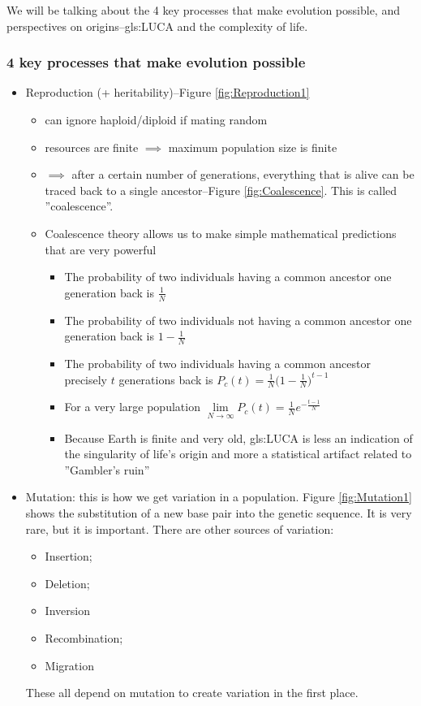\documentclass[]{article}
\begin{document}
We will be talking about the 4 key processes that make evolution possible, and perspectives on origins--\gls{gls:LUCA} and the complexity of life.

\subsubsection{4 key processes that make evolution possible}

\begin{itemize}
	\item Reproduction (+ heritability)--Figure \ref{fig:Reproduction1}
	\begin{itemize}
		\item can ignore haploid/diploid if mating random
		\item resources are finite $\implies$ maximum population size is finite
		\item $\implies$ after a certain number of generations, everything that is alive can be traced back to a single ancestor--Figure \ref{fig:Coalescence}. This is called ''coalescence''.
		\item Coalescence theory allows us to make simple mathematical predictions that are very powerful
		\begin{itemize}
			\item The probability of two individuals having a common ancestor one generation back is $\frac{1}{N}$
			\item The probability of two individuals not having a common ancestor one generation back is $1-\frac{1}{N}$
			\item The probability of two individuals having a common ancestor precisely $t$ generations back is $P_c(t)=\frac{1}{N}\big(1-\frac{1}{N}\big)^{t-1}$
			\item For a very large population $\lim\limits_{N\rightarrow \infty} P_c(t)=\frac{1}{N}e^{-\frac{t-1}{N}}$
			\item Because Earth is finite and very old, \gls{gls:LUCA} is less an
			indication of the singularity of life’s origin and more a
			statistical artifact related to ''Gambler’s ruin''
		\end{itemize}
	
	\end{itemize}
	\item Mutation: this is how we get variation in a population. Figure \ref{fig:Mutation1} shows the substitution of a new base pair into the genetic sequence. It is very rare, but it is important. There are other sources of variation:
	\begin{itemize}
		\item  Insertion;
		\item Deletion;
		\item Inversion
		\item Recombination;
		\item Migration
	\end{itemize}
	These all depend on mutation to create variation in the first place.


\end{itemize}
\end{document}
